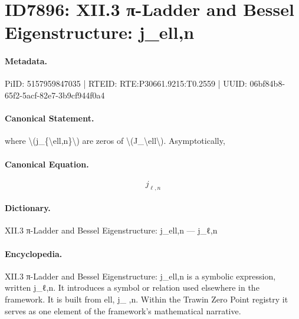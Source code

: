 \section*{ID7896: XII.3 π-Ladder and Bessel Eigenstructure: j\_ell,n}
\paragraph{Metadata.}
PiID: 5157959847035 | RTEID: RTE:P30661.9215:T0.2559 | UUID: 06bf84b8-65f2-5acf-82e7-3b9cf944f0a4

\paragraph{Canonical Statement.}
where \textbackslash{}(j\_\{\textbackslash{}ell,n\}\textbackslash{}) are zeros of \textbackslash{}(J\_\textbackslash{}ell\textbackslash{}). Asymptotically,

\paragraph{Canonical Equation.}
\[
j_{\ell,n}
\]

\paragraph{Dictionary.}
XII.3 π-Ladder and Bessel Eigenstructure: j\_ell,n — j\_ℓ,n

\paragraph{Encyclopedia.}
XII.3 π-Ladder and Bessel Eigenstructure: j\_ell,n is a symbolic expression, written j\_ℓ,n. It introduces a symbol or relation used elsewhere in the framework. It is built from ell, j\_ ,n. Within the Trawin Zero Point registry it serves as one element of the framework's mathematical narrative.
